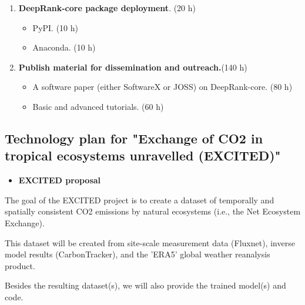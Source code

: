 \begin{enumerate}[start=1,leftmargin=.8in,label={\bfseries \textbullet{} Task \arabic*:}]
\begin{itemize}[label=o]
    \end{itemize}
    \item \textbf{DeepRank-core package deployment}. (20 h)
    \begin{itemize}[label=o]
        \item PyPI. (10 h)
        \item Anaconda. (10 h)
    \end{itemize}
    \item \textbf{Publish material for dissemination and outreach.}(140 h)
    \begin{itemize}[label=o]
        \item A software paper (either SoftwareX or JOSS) on DeepRank-core. (80 h)
        \item Basic and advanced tutorials. (60 h)
    \end{itemize}
\end{enumerate}


\clearpage
\subsection{Technology plan for "Exchange of CO2 in tropical ecosystems unravelled (EXCITED)"}

\bigskip
\begin{itemize}
\item \textbf{EXCITED proposal}
\end{itemize}
\begin{description}[fullwidth,style=nextline]
    \item[] The goal of the EXCITED project is to create a dataset of temporally and spatially consistent CO2 emissions by natural
    ecosystems (i.e., the Net Ecosystem Exchange). 
    \item[] This dataset will be created from site-scale measurement data (Fluxnet), inverse model results (CarbonTracker), and the 'ERA5' global weather reanalysis product. 
    \item[] Besides the resulting dataset(s), we will also provide the trained model(s) and code. 
\end{description}

